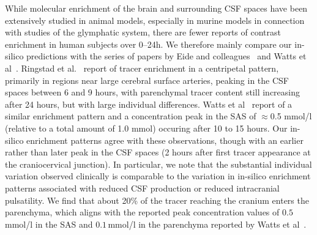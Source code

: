 \documentclass[fleqn,10pt]{wlscirep}
\begin{document}
While molecular enrichment of the brain and surrounding CSF spaces
have been extensively studied in animal models, especially in murine
models in connection with studies of the glymphatic system, there are
fewer reports of contrast enrichment in human subjects over 0--24h. We
therefore mainly compare our in-silico predictions with the series of
papers by Eide and colleagues~\cite{ringstad2017glymphatic,
  ringstad2018brain, eide2021sleep, eide2024functional} and Watts et
al~\cite{watts2019measuring}. Ringstad et al.~\cite{ringstad2018brain}
report of tracer enrichment in a centripetal pattern, primarily in
regions near large cerebral surface arteries, peaking in the CSF
spaces between 6 and 9 hours, with parenchymal tracer content still
increasing after 24 hours, but with large individual
differences. Watts et al~\cite{watts2019measuring} report of a similar
enrichment pattern and a concentration peak in the SAS of $\approx$0.5
mmol/l (relative to a total amount of 1.0 mmol) occuring after 10 to 15 hours. 
Our in-silico enrichment patterns agree with these observations, though with an earlier rather than later peak in the CSF spaces (2 hours after first tracer appearance at the craniocervical junction). In particular, we note that the substantial individual variation observed clinically is comparable to the variation in in-silico enrichment patterns associated with reduced CSF production or reduced intracranial pulsatility. We find that about 20\% of the tracer reaching the cranium enters the parenchyma, which aligns with the reported peak concentration values of $0.5\,$mmol/l in the SAS and $0.1\,$mmol/l in the parenchyma reported by Watts et al~\cite{watts2019measuring}.
\end{document}
